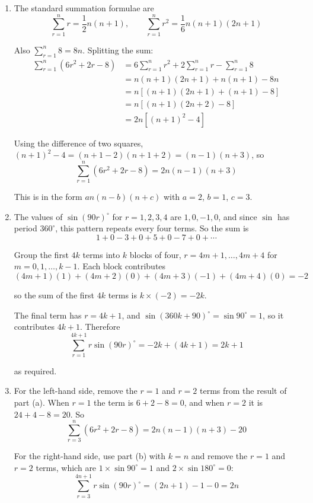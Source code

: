 \documentclass[leqno]{article}
\begin{document}
\begin{enumerate}[
  label=\textbf{\arabic*.},
  leftmargin=*,
  topsep=0pt,
  partopsep=0pt,
  parsep=0pt
]
\vspace*{10pt}

\begin{djsSolution}
\begin{enumerate}[label=\textbf{(\alph*)}, start=1]
  \item The standard summation formulae are
\[
\sum_{r=1}^{n} r=\frac12 n(n+1),\qquad \sum_{r=1}^{n} r^2=\frac16 n(n+1)(2n+1)
\]

Also \(\sum_{r=1}^{n} 8=8n\). Splitting the sum:
\begin{align*}
\sum_{r=1}^{n}\left(6r^2+2r-8\right)&=6\sum_{r=1}^{n} r^2+2\sum_{r=1}^{n} r-\sum_{r=1}^{n}8\\
&=n(n+1)(2n+1)+n(n+1)-8n\\
&=n\left[(n+1)(2n+1)+(n+1)-8\right]\\
&=n\left[(n+1)(2n+2)-8\right]\\
&=2n\left[(n+1)^2-4\right]
\end{align*}

Using the difference of two squares, \((n+1)^2-4=(n+1-2)(n+1+2)=(n-1)(n+3)\), so
\[
\sum_{r=1}^{n}\left(6r^2+2r-8\right)=2n(n-1)(n+3)
\]

This is in the form \(an(n-b)(n+c)\) with \(a=2\), \(b=1\), \(c=3\).

  \item The values of \(\sin(90r)^\circ\) for \(r=1,2,3,4\) are \(1,0,-1,0\), and since \(\sin\) has period \(360^\circ\), this pattern repeats every four terms. So the sum is
\[
1+0-3+0+5+0-7+0+\cdots
\]

Group the first \(4k\) terms into \(k\) blocks of four, \(r=4m+1,\ldots,4m+4\) for \(m=0,1,\ldots,k-1\). Each block contributes
\[
(4m+1)(1)+(4m+2)(0)+(4m+3)(-1)+(4m+4)(0)=-2
\]

so the sum of the first \(4k\) terms is \(k\times(-2)=-2k\).

The final term has \(r=4k+1\), and \(\sin(360k+90)^\circ=\sin 90^\circ=1\), so it contributes \(4k+1\). Therefore
\[
\sum_{r=1}^{4k+1} r\sin(90r)^\circ=-2k+(4k+1)=2k+1
\]

as required.

  \item For the left-hand side, remove the \(r=1\) and \(r=2\) terms from the result of part (a). When \(r=1\) the term is \(6+2-8=0\), and when \(r=2\) it is \(24+4-8=20\). So
\[
\sum_{r=3}^{n}\left(6r^2+2r-8\right)=2n(n-1)(n+3)-20
\]

For the right-hand side, use part (b) with \(k=n\) and remove the \(r=1\) and \(r=2\) terms, which are \(1\times\sin 90^\circ=1\) and \(2\times\sin180^\circ=0\):
\[
\sum_{r=3}^{4n+1} r\sin(90r)^\circ=(2n+1)-1-0=2n
\]


\end{enumerate}
\end{djsSolution}
\end{enumerate}
\end{document}
